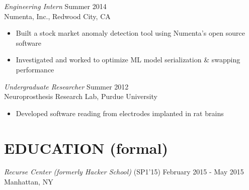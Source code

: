 \documentclass[margin,4pt]{res} %
\begin{document}
\begin{resume}
	{\sl Engineering Intern} \hfill Summer 2014\\
          Numenta, Inc., Redwood City, CA
		\begin{itemize} \itemsep -2pt
		\item Built a stock market anomaly detection tool using Numenta's open source software
		\item Investigated and worked to optimize ML model serialization \& swapping performance
		\end{itemize}


	{\sl Undergraduate Researcher} \hfill Summer 2012\\
          Neuroprosthesis Research Lab, Purdue University
	    	\begin{itemize} \itemsep -2pt
	    	\item Developed software reading from electrodes implanted in rat brains
	    	\end{itemize}



\section{EDUCATION (formal)}
	{\sl Recurse Center (formerly Hacker School)} \hfill (SP1'15) February 2015 - May 2015\\
		Manhattan, NY


\end{resume}
\end{document}
